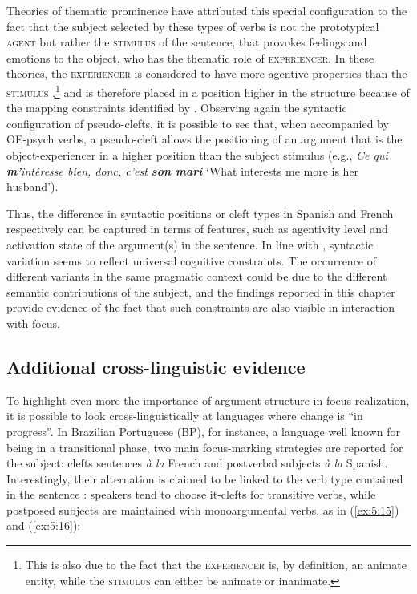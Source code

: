 Theories of thematic prominence have attributed this special configuration to the fact that the subject selected by these types of verbs is not the prototypical \textsc{agent} but rather the \textsc{stimulus} of the sentence, that provokes feelings and emotions to the object, who has the thematic role of \textsc{experiencer}. In these theories, the \textsc{experiencer} is considered to have more agentive properties than the \textsc{stimulus} \parencite{gutierrez2013structural},\footnote{This is also due to the fact that the \textsc{experiencer} is, by definition, an animate entity, while the \textsc{stimulus} can either be animate or inanimate.} and is therefore placed in a position higher in the structure because of the mapping constraints identified by \textcite{lambrecht2010constraints}. Observing again the syntactic configuration of pseudo-clefts, it is possible to see that, when accompanied by OE-psych verbs, a pseudo-cleft allows the positioning of an argument that is the object-experiencer in a higher position than the subject stimulus (e.g., \textit{Ce qui \textbf{m'}intéresse bien, donc, c'est \textbf{{son mari}}} `What interests me more is her husband').

Thus, the difference in syntactic positions or cleft types in Spanish and French respectively can be captured in terms of features, such as agentivity level and activation state of the argument(s) in the sentence. In line with \textcite{lambrecht2010constraints}, syntactic variation seems to reflect universal cognitive constraints. The occurrence of different variants in the same pragmatic context could be due to the different semantic contributions of the subject, and the findings reported in this chapter provide evidence of the fact that such constraints are also visible in interaction with focus.

\subsection{Additional cross-linguistic evidence} \label{sub:6.10.6}
To highlight even more the importance of argument structure in focus realization, it is possible to look cross-linguistically at languages where change is ``in progress”. In Brazilian Portuguese (BP), for instance, a language well known for being in a transitional phase, two main focus-marking strategies are reported for the subject: clefts sentences \textit{à la} French and postverbal subjects \textit{à la} Spanish. Interestingly, their alternation is claimed to be linked to the verb type contained in the sentence \parencite{kato2006focus}: speakers tend to choose it-clefts for transitive verbs, while postposed subjects are maintained with monoargumental verbs, as in (\ref{ex:5:15}) and (\ref{ex:5:16}):

